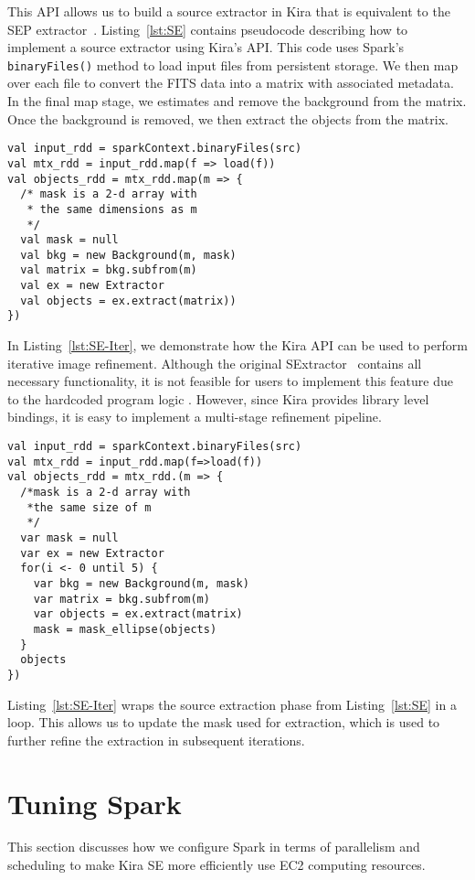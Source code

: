 \documentclass[conference]{IEEEtran}
\begin{document}
This API allows us to build a source extractor in Kira that is equivalent to the SEP
extractor~\cite{barbary2015}.
Listing~\ref{lst:SE} contains pseudocode describing how to implement a source extractor
using Kira's API. This code uses Spark's \texttt{binaryFiles()} method to load input
files from persistent storage. We then map over each file to convert the FITS data into
a matrix with associated metadata. In the final map stage, we estimates and remove the
background from the matrix. Once the background is removed, we then extract the objects
from the matrix.

\begin{lstlisting}[caption=Objects Extraction Logic, label=lst:SE, linewidth=0.5\textwidth, xleftmargin=2.5ex]
val input_rdd = sparkContext.binaryFiles(src)
val mtx_rdd = input_rdd.map(f => load(f))
val objects_rdd = mtx_rdd.map(m => {
  /* mask is a 2-d array with 
   * the same dimensions as m
   */
  val mask = null
  val bkg = new Background(m, mask)
  val matrix = bkg.subfrom(m)
  val ex = new Extractor
  val objects = ex.extract(matrix))
})
\end{lstlisting}

In Listing~\ref{lst:SE-Iter}, we demonstrate how the Kira API can be used to perform
iterative image refinement. Although the original SExtractor~\cite{bertin96} contains all necessary functionality, 
it is not feasible for users to implement this feature due to the hardcoded program logic . However, since Kira provides
library level bindings, it is easy to implement a multi-stage refinement pipeline.

\begin{lstlisting}[caption=Iterative Objects Extraction Logic, label=lst:SE-Iter, linewidth=0.5\textwidth, xleftmargin=2.5ex]
val input_rdd = sparkContext.binaryFiles(src)
val mtx_rdd = input_rdd.map(f=>load(f))
val objects_rdd = mtx_rdd.(m => {
  /*mask is a 2-d array with 
   *the same size of m
   */
  var mask = null
  var ex = new Extractor   
  for(i <- 0 until 5) {
    var bkg = new Background(m, mask)
    var matrix = bkg.subfrom(m) 
    var objects = ex.extract(matrix)
    mask = mask_ellipse(objects)  
  }
  objects
})
\end{lstlisting}

Listing~\ref{lst:SE-Iter} wraps the source extraction phase from Listing~\ref{lst:SE} in a loop. 
This allows us to update the mask used for extraction, which is used to further refine the extraction
 in subsequent iterations.


\section{Tuning Spark}
This section discusses how we configure Spark in terms of parallelism and scheduling to make
Kira SE more efficiently use EC2 computing resources. 
\end{document}
